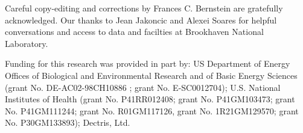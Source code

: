 \documentclass[preprint]{iucr}              %
\begin{document}


     
     
	Careful copy-editing and corrections by Frances C. Bernstein are 
gratefully acknowledged.  	Our thanks to Jean Jakoncic and Alexei Soares for 
helpful conversations and access to data and facilties at 
Brookhaven National Laboratory.


Funding for this research was provided in part by: US Department of Energy Offices of Biological and Environmental Research and of Basic Energy Sciences (grant No. DE-AC02-98CH10886 ; grant No. E-SC0012704); U.S. National Institutes of Health (grant No. P41RR012408; grant No. P41GM103473; grant No. P41GM111244; grant No. R01GM117126, grant No. 1R21GM129570; grant No. P30GM133893); Dectris, Ltd.





     
\end{document}
